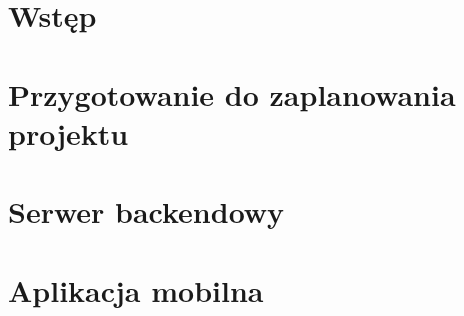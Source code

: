 \chapter*{Wstęp}




\chapter{Przygotowanie do zaplanowania projektu}





\chapter{Serwer backendowy}





\chapter{Aplikacja mobilna}


